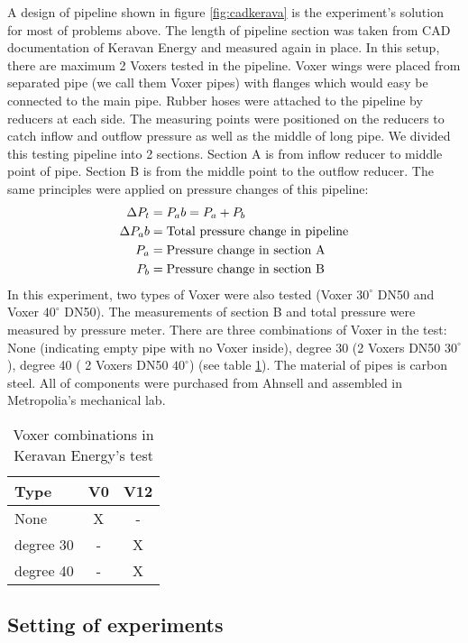 A design of pipeline shown in figure \vref{fig:cadkerava} is the experiment's solution for most of problems above. The length of pipeline section was taken from CAD documentation of Keravan Energy and measured again in place. In this setup, there are maximum 2 Voxers tested in the pipeline. Voxer wings were placed from separated pipe (we call them Voxer pipes) with flanges which would easy be connected to the main pipe. 
Rubber hoses were attached to the pipeline by reducers at each side. The measuring points were positioned on the reducers to catch inflow and outflow pressure as well as the middle of long pipe. We divided this testing pipeline into 2 sections. Section A is from inflow reducer to middle point of pipe. Section B is from the middle point to the outflow reducer. The same principles were applied on pressure changes of this pipeline: 
\begin{align}
\Delta P_t&= P_ab = P_a + P_b \\
\Delta P_ab&= \textnormal{Total pressure change in pipeline} \\
P_a&= \textnormal{Pressure change in section A} \\
P_b&= \textnormal{Pressure change in section B} \\
\end{align}
In this experiment, two types of Voxer were also tested (Voxer $30^{\circ}$ DN50 and Voxer $40^{\circ}$ DN50). The measurements of section B and total pressure were measured by pressure meter. There are three combinations of Voxer in the test: None (indicating empty pipe with no Voxer inside), degree 30 (2 Voxers DN50 $30^{\circ}$), degree 40 ( 2 Voxers DN50 $40^{\circ}$) (see table \ref{table:kerava}). The material of pipes is carbon steel. All of components were purchased from Ahnsell and assembled in Metropolia's mechanical lab.

\begin{table}[h]
  \centering
  \caption{Voxer combinations in Keravan Energy's test}
  \begin{tabular}{l*{2}{c}}
Type             & V0 & V12 \\
\hline
None & X & -   \\
degree 30           & - & X   \\
degree 40          & - & X   \\
\end{tabular}
  \label{table:kerava}
\end{table}

\subsection{Setting of experiments}

